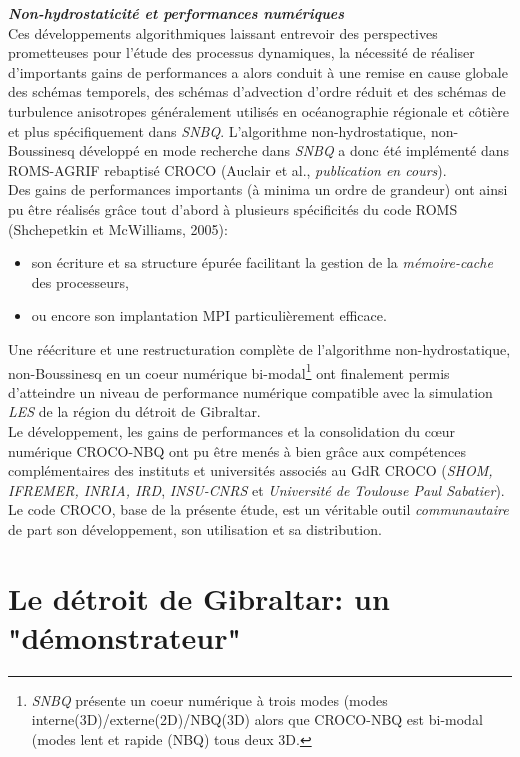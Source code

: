 \documentclass[a4paper,11pt]{report}
\begin{document}
\noindent \textit{\textbf{Non-hydrostaticité et performances numériques}}\\
Ces développements algorithmiques laissant entrevoir des perspectives prometteuses pour l'étude des processus dynamiques, la nécessité de réaliser d'importants gains de performances a alors conduit à une remise en cause globale des schémas temporels, des schémas d'advection d'ordre réduit et des schémas de turbulence anisotropes généralement utilisés en océanographie régionale et côtière et plus spécifiquement dans \textit{SNBQ}. L'algorithme non-hydrostatique, non-Boussinesq développé en mode recherche dans \textit{SNBQ} a donc été implémenté dans ROMS-AGRIF rebaptisé CROCO (Auclair et al., \textit{publication en cours}). \\
Des gains de performances importants (à minima un ordre de grandeur) ont ainsi pu être réalisés grâce tout d'abord à plusieurs spécificités du code ROMS (Shchepetkin et McWilliams, 2005): 
\begin{itemize}
	\item son écriture et sa structure épurée facilitant la gestion de la \textit{mémoire-cache} des processeurs, 
	\item ou encore son implantation MPI particulièrement efficace. 
\end{itemize}

\noindent Une réécriture et une restructuration complète de l'algorithme non-hydrostatique, non-Boussinesq en un coeur numérique bi-modal\footnote{\textit{SNBQ} présente un coeur numérique à trois modes (modes interne(3D)/externe(2D)/NBQ(3D) alors que CROCO-NBQ est bi-modal (modes lent et rapide (NBQ) tous deux 3D.} ont finalement permis d'atteindre un niveau de performance numérique compatible avec la simulation \textit{LES} de la région du détroit de Gibraltar.\\
Le développement, les gains de performances et la consolidation du cœur numérique CROCO-NBQ ont pu être menés à bien grâce aux compétences complémentaires des instituts et universités associés au GdR CROCO (\textit{SHOM, IFREMER, INRIA, IRD}, \textit{INSU-CNRS} et \textit{Université de Toulouse Paul Sabatier}). Le code CROCO, base de la présente étude, est un véritable outil \textit{communautaire} de part son développement, son utilisation et sa distribution.\\


\section{Le détroit de Gibraltar: un "démonstrateur"}
\end{document}

